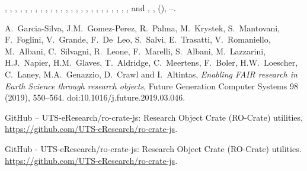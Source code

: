 \documentclass[ds,v1.1.2,openaccess]{iosart2x}%
\begin{document}
\begin{thebibliography}{}
%
\begin{barticle}
,
,
,
,
,
,
,
,
,
,
,
,
,
,
,
,
,
,
,
,
,
,
,
,
,
 and
,
,
(),
--.
\end{barticle}
%
\OrigBibText
A.~Garcia-Silva,
J.M.~Gomez-Perez,
R.~Palma,
M.~Krystek,
S.~Mantovani,
F.~Foglini,
V.~Grande,
F.~De~Leo,
S.~Salvi,
E.~Trasatti,
V.~Romaniello,
M.~Albani,
C.~Silvagni,
R.~Leone,
F.~Marelli,
S.~Albani,
M.~Lazzarini,
H.J.~Napier,
H.M.~Glaves,
T.~Aldridge,
C.~Meertens,
F.~Boler,
H.W.~Loescher,
C.~Laney,
M.A.~Genazzio,
D.~Crawl and
I.~Altintas,
\textit{Enabling {FAIR} research in Earth Science through research objects},
Future Generation Computer Systems
98
(2019),
550--564.
doi:10.1016/j.future.2019.03.046.
\endOrigBibText
{}
\endbibitem

%
\begin{botherref}
{{GitHub}} -- {UTS}-{eResearch}/ro-crate-js: Research Object
Crate ({RO}-Crate) utilities,
\url{https://github.com/UTS-eResearch/ro-crate-js}.
\end{botherref}
%
\OrigBibText
{GitHub} - {UTS}-{eResearch}/ro-crate-js: Research Object Crate ({RO}-Crate)
utilities.
\url{https://github.com/UTS-eResearch/ro-crate-js}.
\endOrigBibText
{}
\endbibitem


\end{thebibliography}
\end{document}
